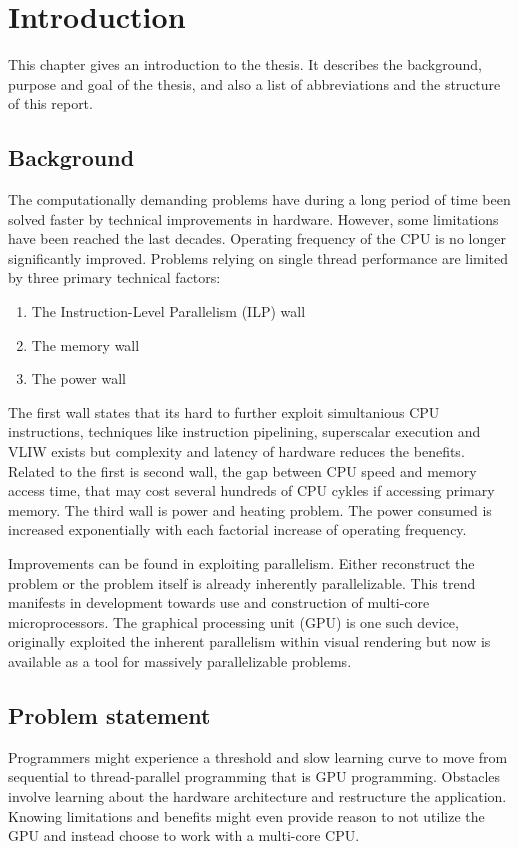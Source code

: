 \chapter{Introduction}\label{cha:intro}
This chapter gives an introduction to the thesis. It describes the background, purpose and goal of the thesis, and also a list of abbreviations and the structure of this report.

\section{Background}
The computationally demanding problems have during a long period of time been solved faster by technical improvements in hardware. However, some limitations have been reached the last decades. Operating frequency of the CPU is no longer significantly improved. Problems relying on single thread performance are limited by three primary technical factors:
\begin{enumerate}
	\item The Instruction-Level Parallelism (ILP) wall
	\item The memory wall
	\item The power wall
\end{enumerate}

The first wall states that its hard to further exploit simultanious CPU instructions, techniques like instruction pipelining, superscalar execution and VLIW exists but complexity and latency of hardware reduces the benefits. Related to the first is second wall, the gap between CPU speed and memory access time, that may cost several hundreds of CPU cykles if accessing primary memory. The third wall is power and heating problem. The power consumed is increased exponentially with each factorial increase of operating frequency.

Improvements can be found in exploiting parallelism. Either reconstruct the problem or the problem itself is already inherently parallelizable. This trend manifests in development towards use and construction of multi-core microprocessors. The graphical processing unit (GPU) is one such device, originally exploited the inherent parallelism within visual rendering but now is available as a tool for massively parallelizable problems.

\section{Problem statement}
Programmers might experience a threshold and slow learning curve to move from sequential to thread-parallel programming that is GPU programming. Obstacles involve learning about the hardware architecture and restructure the application. Knowing limitations and benefits might even provide reason to not utilize the GPU and instead choose to work with a multi-core CPU.

